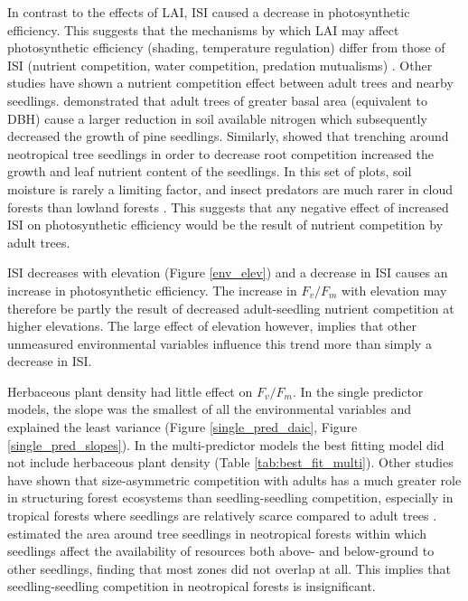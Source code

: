 \documentclass[a4paper, 11pt]{article}
\begin{document}
In contrast to the effects of LAI, ISI caused a decrease in photosynthetic efficiency. This suggests that the mechanisms by which LAI may affect photosynthetic efficiency (shading, temperature regulation) differ from those of ISI (nutrient competition, water competition, predation mutualisms) \citep{Lewis2000}. Other studies have shown a nutrient competition effect between adult trees and nearby seedlings. \citet{Palik1997} demonstrated that adult trees of greater basal area (equivalent to DBH) cause a larger reduction in soil available nitrogen which subsequently decreased the growth of pine seedlings. Similarly, \citet{Barberis2005} showed that trenching around neotropical tree seedlings in order to decrease root competition increased the growth and leaf nutrient content of the seedlings. In this set of plots, soil moisture is rarely a limiting factor, and insect predators are much rarer in cloud forests than lowland forests \citep{Rodriguez-Castaeda2010}. This suggests that any negative effect of increased ISI on photosynthetic efficiency would be the result of nutrient competition by adult trees.

ISI decreases with elevation (Figure \ref{env_elev}) and a decrease in ISI causes an increase in photosynthetic efficiency. The increase in $F_v/F_m$ with elevation may therefore be partly the result of decreased adult-seedling nutrient competition at higher elevations. The large effect of elevation however, implies that other unmeasured environmental variables influence this trend more than simply  a decrease in ISI.

Herbaceous plant density had little effect on $F_v/F_m$. In the single predictor models, the slope was the smallest of all the environmental variables and explained the least variance (Figure \ref{single_pred_daic}, Figure \ref{single_pred_slopes}). In the multi-predictor models the best fitting model did not include herbaceous plant density (Table \ref{tab:best_fit_multi}). Other studies have shown that size-asymmetric competition with adults has a much greater role in structuring forest ecosystems than seedling-seedling competition, especially in tropical forests where seedlings are relatively scarce compared to adult trees \citep{Moles2004, Powers2004}. \citet{Paine2008} estimated the area around tree seedlings in neotropical forests within which seedlings affect the availability of resources both above- and below-ground to other seedlings, finding that most zones did not overlap at all. This implies that seedling-seedling competition in neotropical forests is insignificant. 
\end{document}
